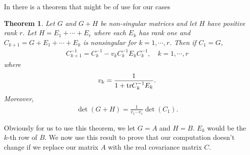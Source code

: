 \documentclass[10pt]{article}
\newtheorem{theorem}{\bf Theorem}
\newenvironment{Proof of lemma}{\noindent{\bf Proof of Lemma}}{\hfill$\Box$\newline}
\newenvironment{Proof of claim}{\noindent{\bf Proof of claim}}{\hfill$\Box$\newline}
\newenvironment{Proof of theorem}{\noindent{\bf Proof of Theorem}}{\hfill\scriptsize{$\Box$}\newline}
\newenvironment{Proof of theorems}{\noindent{\bf Proof of Theorems}}{\hfill$\Box$\newline}
\newenvironment{Proof of proposition}{\noindent{\bf Proof of Proposition}}{\hfill$\Box$\newline}
\newenvironment{Proof of propositions}{\noindent{\bf Proof of Propositions}}{\hfill$\Box$\newline}
\newenvironment{Proof of exercise}{\noindent{\it Proof of Exercise:}}{\hfill$\Box$}
\numberwithin{equation}{section}
\begin{document}
In \cite{MillerMatrix} there is a theorem that might be of use for our cases
\begin{theorem}
    Let $G$ and $G+H$ be non-singular matrices and let $H$ have positive rank $r$. Let $H = E_1 + \cdots +E_r$ where each $E_k$ has rank one and $C_{k+1} = G + E_1 + \cdots +E_k$ is nonsingular for $k = 1, \cdots, r$. Then if $C_1 = G$,
    \begin{align}
        C_{k+1}^{-1} =  C_{k}^{-1} - v_kC_{k}^{-1}E_kC_{k}^{-1}, \quad k = 1, \cdots, r
    \end{align}
    where
    \begin{align}
        v_k = \frac{1}{1+ \text{\normalfont tr} C_{k}^{-1}E_k}.
    \end{align}
    Moreover,
    \begin{align} \label{det_recur}
        \det(G+H) = \frac{1}{v_1\cdots v_r}\det(C_1).
    \end{align}
\end{theorem}
Obviously for us to use this theorem, we let $G=A$ and $H=B$. $E_k$ would be the $k$-th row of $B$. We now use this result to prove that our computation doesn't change if we replace our matrix $A$ with the real covariance matrix $C$.
\end{document}
